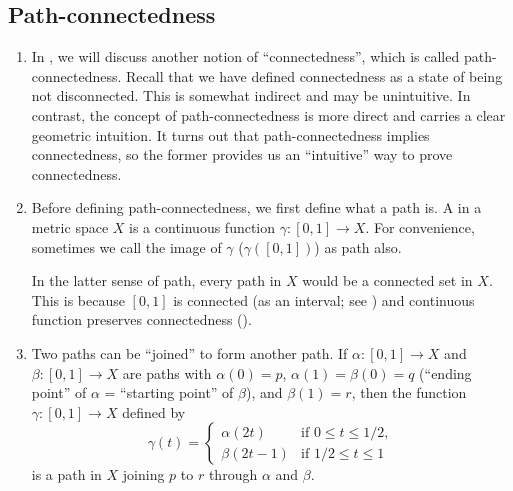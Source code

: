 \subsection{Path-connectedness}
\label{subsect:path-conn}
\begin{enumerate}
\item In , we will discuss another notion of
``connectedness'', which is called path-connectedness. Recall that we have
defined connectedness as a state of being not disconnected. This is somewhat
indirect and may be unintuitive. In contrast, the concept of path-connectedness
is more direct and carries a clear geometric intuition. It turns out that
path-connectedness implies connectedness, so the former provides us an
``intuitive'' way to prove connectedness.

\item Before defining path-connectedness, we first define what a path is. A
 in a metric space \(X\) is a continuous function \(\gamma:[0,1]\to
X\). For convenience, sometimes we call the image of \(\gamma\)
(\(\gamma([0,1])\)) as path also.

In the latter sense of path, every path in \(X\) would be a connected set in
\(X\). This is because \([0,1]\) is connected (as an interval; see
) and continuous function preserves connectedness
().

\item Two paths can be ``joined'' to form another path. If \(\alpha:[0,1]\to
X\) and \(\beta:[0,1]\to X\) are paths with \(\alpha(0)=p\),
\(\alpha(1)=\beta(0)=q\) (``ending point'' of \(\alpha\) = ``starting point''
of \(\beta\)), and \(\beta(1)=r\), then the function \(\gamma:[0,1]\to X\)
defined by
\[
\gamma(t)=\begin{cases}
\alpha(2t)&\text{if \(0\le t\le 1/2\)},\\
\beta(2t-1)&\text{if \(1/2\le t\le 1\)}
\end{cases}
\]
is a path in \(X\) joining \(p\) to \(r\) through \(\alpha\) and \(\beta\).
\begin{center}
\end{center}


\end{enumerate}
